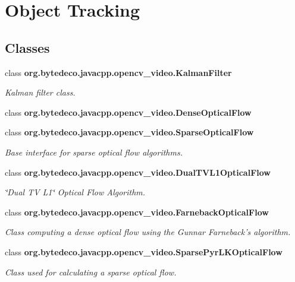 \hypertarget{group__video__track}{}\section{Object Tracking}
\label{group__video__track}
\subsection*{Classes}
\begin{DoxyCompactItemize}
\item 
class {\bfseries org.\+bytedeco.\+javacpp.\+opencv\+\_\+video.\+Kalman\+Filter}
\begin{DoxyCompactList}\small\item\em Kalman filter class. \end{DoxyCompactList}\item 
class {\bfseries org.\+bytedeco.\+javacpp.\+opencv\+\_\+video.\+Dense\+Optical\+Flow}
\item 
class {\bfseries org.\+bytedeco.\+javacpp.\+opencv\+\_\+video.\+Sparse\+Optical\+Flow}
\begin{DoxyCompactList}\small\item\em Base interface for sparse optical flow algorithms. \end{DoxyCompactList}\item 
class {\bfseries org.\+bytedeco.\+javacpp.\+opencv\+\_\+video.\+Dual\+T\+V\+L1\+Optical\+Flow}
\begin{DoxyCompactList}\small\item\em \char`\"{}\+Dual T\+V L1\char`\"{} Optical Flow Algorithm. \end{DoxyCompactList}\item 
class {\bfseries org.\+bytedeco.\+javacpp.\+opencv\+\_\+video.\+Farneback\+Optical\+Flow}
\begin{DoxyCompactList}\small\item\em Class computing a dense optical flow using the Gunnar Farneback’s algorithm. \end{DoxyCompactList}\item 
class {\bfseries org.\+bytedeco.\+javacpp.\+opencv\+\_\+video.\+Sparse\+Pyr\+L\+K\+Optical\+Flow}
\begin{DoxyCompactList}\small\item\em Class used for calculating a sparse optical flow. \end{DoxyCompactList}\end{DoxyCompactItemize}
